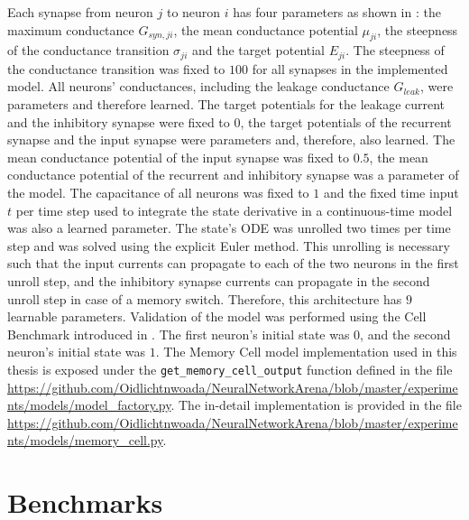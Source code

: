 \documentclass[draft,final]{vutinfth} %
\begin{document}
    Each synapse from neuron $j$ to neuron $i$ has four parameters as shown in : the maximum conductance $G_{syn,ji}$, the mean conductance potential $\mu_{ji}$, the steepness of the conductance transition $\sigma_{ji}$ and the target potential $E_{ji}$.
    The steepness of the conductance transition was fixed to $100$ for all synapses in the implemented model.
    All neurons' conductances, including the leakage conductance $G_{leak}$, were parameters and therefore learned.
    The target potentials for the leakage current and the inhibitory synapse were fixed to $0$, the target potentials of the recurrent synapse and the input synapse were parameters and, therefore, also learned.
    The mean conductance potential of the input synapse was fixed to $0.5$, the mean conductance potential of the recurrent and inhibitory synapse was a parameter of the model.
    The capacitance of all neurons was fixed to $1$ and the fixed time input $t$ per time step used to integrate the state derivative in a continuous-time model was also a learned parameter.
    The state's ODE was unrolled two times per time step and was solved using the explicit Euler method.
    This unrolling is necessary such that the input currents can propagate to each of the two neurons in the first unroll step, and the inhibitory synapse currents can propagate in the second unroll step in case of a memory switch.
    Therefore, this architecture has $9$ learnable parameters.
    Validation of the model was performed using the Cell Benchmark introduced in .
    The first neuron's initial state was $0$, and the second neuron's initial state was $1$.
    The Memory Cell model implementation used in this thesis is exposed under the \texttt{get\_memory\_cell\_output} function defined in the file \url{https://github.com/Oidlichtnwoada/NeuralNetworkArena/blob/master/experiments/models/model_factory.py}.
    The in-detail implementation is provided in the file \url{https://github.com/Oidlichtnwoada/NeuralNetworkArena/blob/master/experiments/models/memory_cell.py}.


    \chapter{Benchmarks}
\end{document}

